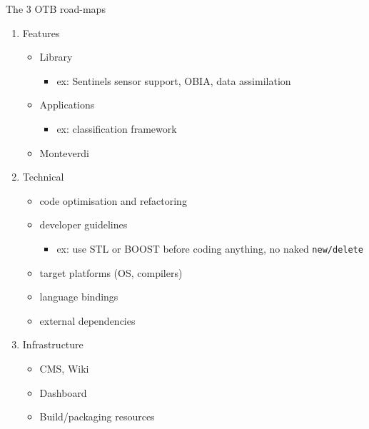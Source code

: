 \documentclass[8pt]{beamer}
\begin{document}
\begin{frame}[fragile,label=sec-7]{The 3 OTB road-maps}
 \begin{enumerate}
\item Features
\begin{itemize}
\item Library
\begin{itemize}
\item ex: Sentinels sensor support, OBIA, data assimilation
\end{itemize}
\item Applications
\begin{itemize}
\item ex: classification framework
\end{itemize}
\item Monteverdi
\end{itemize}
\item Technical
\begin{itemize}
\item code optimisation and refactoring
\item developer guidelines
\begin{itemize}
\item ex: use STL or BOOST before coding anything, no naked \verb~new/delete~
\end{itemize}
\item target platforms (OS, compilers)
\item language bindings
\item external dependencies
\end{itemize}
\item Infrastructure
\begin{itemize}
\item CMS, Wiki
\item Dashboard
\item Build/packaging resources
\end{itemize}
\end{enumerate}
\end{frame}
\end{document}
